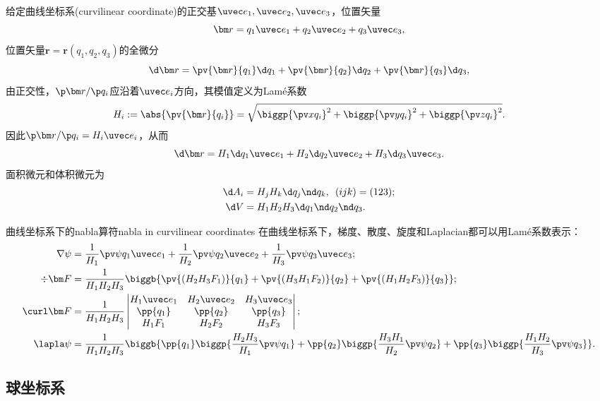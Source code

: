 给定曲线坐标系(curvilinear coordinate)的正交基$\uvec e_1,\uvec e_2,\uvec e_3$，位置矢量
\[
    \bm r=q_1\uvec e_1+q_2\uvec e_2+q_3\uvec e_3,
\]
位置矢量$\bm r=\bm r(q_1,q_2,q_3)$的全微分
\[
    \d\bm r=\pv{\bm r}{q_1}\d q_1+\pv{\bm r}{q_2}\d q_2+\pv{\bm r}{q_3}\d q_3,
\]
由正交性，$\p\bm r/\p q_i$应沿着$\uvec e_i$方向，其模值定义为Lam\'e系数
\begin{equation}
    H_i:=\abs{\pv{\bm r}{q_i}}=\sqrt{\biggp{\pv x{q_i}}^2+\biggp{\pv y{q_i}}^2+\biggp{\pv z{q_i}}^2}.
\end{equation}
因此$\p\bm r/\p q_i=H_i\uvec e_i$，从而
\begin{equation}
    \d\bm r=H_1\d q_1\uvec e_1+H_2\d q_2\uvec e_2+H_3\d q_3\uvec e_3.
\end{equation}
面积微元和体积微元为
\begin{align}
    \d A_i&=H_jH_k\d q_j\nd q_k,\enspace (ijk)=(123);\\
    \d V&=H_1H_2H_3\d q_1\nd q_2\nd q_3.
\end{align}

\begin{theorem}
    {曲线坐标系下的nabla算符}{nabla in curvilinear coordinates}
    在曲线坐标系下，梯度、散度、旋度和Laplacian都可以用Lam\'e系数表示：
    \begin{align}
        \label{eqn:grad Lame}
        \nabla\psi&=\frac1{H_1}\pv\psi{q_1}\uvec e_1+\frac1{H_2}\pv\psi{q_2}\uvec e_2+\frac1{H_3}\pv\psi{q_3}\uvec e_3;\\
        \label{eqn:div Lame}
        \div\bm F&=\frac1{H_1H_2H_3}\biggb{\pv{(H_2H_3F_1)}{q_1}+\pv{(H_3H_1F_2)}{q_2}+\pv{(H_1H_2F_3)}{q_3}};\\
        \label{eqn:curl Lame}
        \curl\bm F&=\frac1{H_1H_2H_3}\begin{vmatrix}
            H_1\uvec e_1&H_2\uvec e_2&H_3\uvec e_3\\
            \pp{q_1}&\pp{q_2}&\pp{q_3}\\
            H_1F_1&H_2F_2&H_3F_3
        \end{vmatrix};\\
        \label{eqn:Laplacian Lame}
        \lapla\psi&=\frac1{H_1H_2H_3}\biggb{\pp{q_1}\biggp{\frac{H_2H_3}{H_1}\pv\psi{q_1}}+\pp{q_2}\biggp{\frac{H_3H_1}{H_2}\pv\psi{q_2}}+\pp{q_3}\biggp{\frac{H_1H_2}{H_3}\pv\psi{q_3}}}.
    \end{align}
\end{theorem}

\subsection{球坐标系}
\label{ssec:spherical coordinate}

